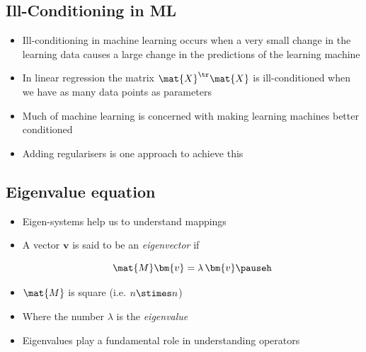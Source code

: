 \begin{slide}
\section{Ill-Conditioning in ML}

\begin{PauseHighLight}
  \begin{itemize}
  \item Ill-conditioning in machine learning occurs when a very small
    change in the learning data causes a large change in the predictions
    of the learning machine\pause
  \item In linear regression the matrix $\mat{X}^\tr\mat{X}$ is
    ill-conditioned when we have as many data points as parameters\pause
  \item Much of machine learning is concerned with making learning
    machines better conditioned\pause
  \item Adding regularisers is one approach to achieve this\pause
  \end{itemize}
\end{PauseHighLight}

\end{slide}

\Outline %

\begin{slide}
\section[-2]{Eigenvalue equation}
\pb

  \begin{itemize}
  \item Eigen-systems help us to understand mappings\pauseh
  \item A vector $\bm{v}$ is said to be an \emph{eigenvector} if
    \begin{minipage}{0.5\linewidth}
      \begin{displaymath}
        \mat{M} \bm{v} = \lambda \, \bm{v}\pauseh
      \end{displaymath}
    \end{minipage}\hfill
    \begin{minipage}{0.4\linewidth}
      \pause
    \end{minipage}
  \item $\mat{M}$ is square (i.e. $n\stimes n$)\pauseh
  \item Where the number $\lambda$ is the \emph{eigenvalue}\pauseh
  \item Eigenvalues play a fundamental role in understanding operators\pauseh
  \end{itemize}


\end{slide}



